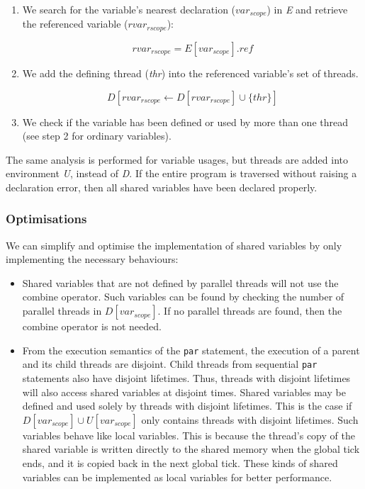 \begin{enumerate}
	\item We search for the variable's nearest declaration ($var_{scope}$) 
		  in \emph{E} and retrieve the referenced variable ($rvar_{rscope}$):
		  
		  \begin{equation*}
			rvar_{rscope} = E[var_{scope}].ref
		  \end{equation*}
		  
	\item We add the defining thread (\emph{thr}) into the referenced variable's 
		  set of threads.
		  
		  \begin{equation*}
		  	D[rvar_{rscope} \gets D[rvar_{rscope}] \cup \{thr\}]
		  \end{equation*}
		  
	\item We check if the variable has been defined or used by more than one thread 
		  (see step 2 for ordinary variables).
\end{enumerate}

The same analysis is performed for variable usages, but threads are added into 
environment \emph{U}, instead of \emph{D}. If the entire program is traversed 
without raising a declaration error, then all shared variables have been declared 
properly.

\subsubsection{Optimisations}
We can simplify and optimise the implementation of shared variables by only 
implementing the necessary behaviours:
\begin{itemize}
	\item Shared variables that are not defined by parallel threads will not 
		  use the combine operator. Such variables can be found by checking 
		  the number of parallel threads in $D[var_{scope}]$. If no parallel 
		  threads are found, then the combine operator is not needed.
	\item From the execution semantics of the \verb$par$ statement, the execution 
		  of a parent and its child threads are disjoint. Child threads from 
		  sequential \verb$par$ statements also have disjoint lifetimes. Thus, 
		  threads with disjoint lifetimes will also access shared variables at 
		  disjoint times. Shared variables may be defined and used solely by 
		  threads with disjoint lifetimes. This is the case if $D[var_{scope}] \cup U[var_{scope}]$ 
		  only contains threads with disjoint lifetimes. Such variables behave 
		  like local variables. This is because the thread's copy of the shared 
		  variable is written directly to the shared memory when the global 
		  tick ends, and it is copied back in the next global tick. These kinds 
		  of shared variables can be implemented as local variables for better 
		  performance.
\end{itemize}




